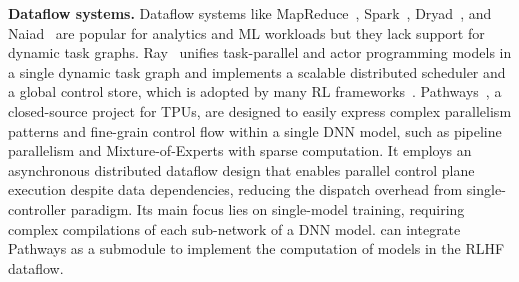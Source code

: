 \noindent\textbf{Dataflow systems.}
Dataflow systems like MapReduce~\cite{dean2008mapreduce}, Spark~\cite{zaharia2016spark}, Dryad~\cite{isard2007dryad}, and Naiad~\cite{murray2013naiad} are popular for analytics and ML workloads but they lack support for dynamic task graphs. 
Ray~\cite{moritz2018ray} unifies task-parallel and actor programming models in a single dynamic task graph and implements a scalable distributed scheduler and a global control store, which is adopted by many RL frameworks~\cite{liang2018rllib, liang2021rllib}. 
Pathways~\cite{barham2022pathways}, a closed-source project for TPUs, are designed to easily express complex parallelism patterns and fine-grain control flow within a single DNN model, such as pipeline parallelism and Mixture-of-Experts with sparse computation. It employs an asynchronous distributed dataflow design that enables parallel control plane execution despite data dependencies, reducing the dispatch overhead from single-controller paradigm. Its main focus lies on single-model training, requiring complex compilations of each sub-network of a DNN model. \sysname{} can integrate Pathways as a submodule to implement the computation of models in the RLHF dataflow.







